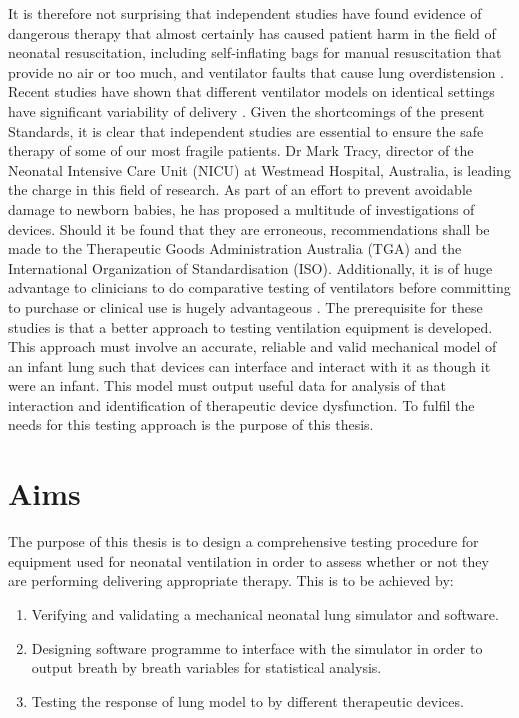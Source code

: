 \documentclass[12pt, openany, oneside]{book}
\begin{document}
It is therefore not surprising that independent studies have found evidence of dangerous therapy that almost certainly has caused patient harm in the field of neonatal resuscitation, including self-inflating bags for manual resuscitation that provide no air or too much, and ventilator faults that cause lung overdistension \citep{hinder2016, tracy2019newborn}. Recent studies have shown that different ventilator models on identical settings have significant variability of delivery \citep{krieger2017volume, itagaki2017effects}. Given the shortcomings of the present Standards, it is clear that independent studies are essential to ensure the safe therapy of some of our most fragile patients. Dr Mark Tracy, director of the Neonatal Intensive Care Unit (NICU) at Westmead Hospital, Australia, is leading the charge in this field of research. As part of an effort to prevent avoidable damage to newborn babies, he has proposed a multitude of investigations of devices. Should it be found that they are erroneous, recommendations shall be made to the Therapeutic Goods Administration Australia (TGA) and the International Organization of Standardisation (ISO). Additionally, it is of huge advantage to clinicians to do comparative testing of ventilators before committing to purchase or clinical use is hugely advantageous \citep{murray}. The prerequisite for these studies is that a better approach to testing ventilation equipment is developed. This approach must involve an accurate, reliable and valid mechanical model of an infant lung such that devices can interface and interact with it as though it were an infant. This model must output useful data for analysis of that interaction and identification of therapeutic device dysfunction. To fulfil the needs for this testing approach is the purpose of this thesis.



\section{Aims}
The purpose of this thesis is to design a comprehensive testing procedure for equipment used for neonatal ventilation in order to assess whether or not they are performing delivering appropriate therapy. This is to be achieved by:
\begin{enumerate}
\item{Verifying and validating a mechanical neonatal lung simulator and software.}
\item{Designing software programme to interface with the simulator in order to output breath by breath variables for statistical analysis.}
\item{Testing the response of lung model to by different therapeutic devices.}
\end{enumerate}
\end{document}
